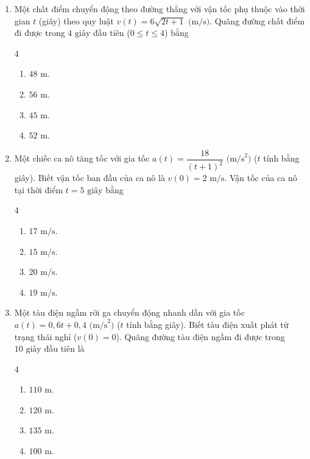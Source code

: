 \documentclass[12pt]{article}
\begin{document}
\begin{enumerate}[label=\textbf{Câu \arabic*.}]
		\item Một chất điểm chuyển động theo đường thẳng với vận tốc phụ thuộc vào thời gian $t$ (giây) theo quy luật $v(t) = 6\sqrt{2t + 1}\text{ (m/s)}$. Quãng đường chất điểm đi được trong $4\text{ giây}$ đầu tiên ($0 \le t \le 4$) bằng
		\begin{multicols}{4}
			\begin{enumerate}[label=\textbf{\Alph*.}]
				\item $48\text{ m}$.
				\item $56\text{ m}$.
				\item $45\text{ m}$.
				\item $52\text{ m}$.
			\end{enumerate}
		\end{multicols}
		
		\item Một chiếc ca nô tăng tốc với gia tốc $a(t) = \dfrac{18}{(t+1)^2}\text{ (m/s}^2\text{)}$ ($t$ tính bằng giây). Biết vận tốc ban đầu của ca nô là $v(0) = 2\text{ m/s}$. Vận tốc của ca nô tại thời điểm $t = 5\text{ giây}$ bằng
		\begin{multicols}{4}
			\begin{enumerate}[label=\textbf{\Alph*.}]
				\item $17\text{ m/s}$.
				\item $15\text{ m/s}$.
				\item $20\text{ m/s}$.
				\item $19\text{ m/s}$.
			\end{enumerate}
		\end{multicols}
		
		\item Một tàu điện ngầm rời ga chuyển động nhanh dần với gia tốc $a(t) = 0{,}6t + 0{,}4\text{ (m/s}^2\text{)}$ ($t$ tính bằng giây). Biết tàu điện xuất phát từ trạng thái nghỉ ($v(0) = 0$). Quãng đường tàu điện ngầm đi được trong $10\text{ giây}$ đầu tiên là
		\begin{multicols}{4}
			\begin{enumerate}[label=\textbf{\Alph*.}]
				\item $110\text{ m}$.
				\item $120\text{ m}$.
				\item $135\text{ m}$.
				\item $100\text{ m}$.
			\end{enumerate}
		\end{multicols}
		

\end{enumerate}
\end{document}
